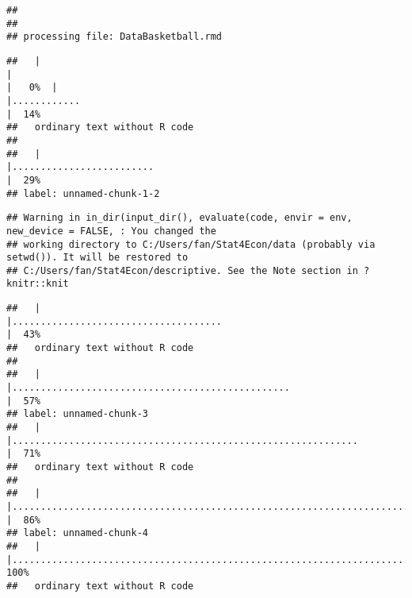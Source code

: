 \documentclass[
]{article}
\begin{document}
\begin{verbatim}
## 
## 
## processing file: DataBasketball.rmd
\end{verbatim}

\begin{verbatim}
##   |                                                                                              |                                                                                      |   0%  |                                                                                              |............                                                                          |  14%
##   ordinary text without R code
## 
##   |                                                                                              |.........................                                                             |  29%
## label: unnamed-chunk-1-2
\end{verbatim}

\begin{verbatim}
## Warning in in_dir(input_dir(), evaluate(code, envir = env, new_device = FALSE, : You changed the
## working directory to C:/Users/fan/Stat4Econ/data (probably via setwd()). It will be restored to
## C:/Users/fan/Stat4Econ/descriptive. See the Note section in ?knitr::knit
\end{verbatim}

\begin{verbatim}
##   |                                                                                              |.....................................                                                 |  43%
##   ordinary text without R code
## 
##   |                                                                                              |.................................................                                     |  57%
## label: unnamed-chunk-3
##   |                                                                                              |.............................................................                         |  71%
##   ordinary text without R code
## 
##   |                                                                                              |..........................................................................            |  86%
## label: unnamed-chunk-4
##   |                                                                                              |......................................................................................| 100%
##   ordinary text without R code
\end{verbatim}
\end{document}
